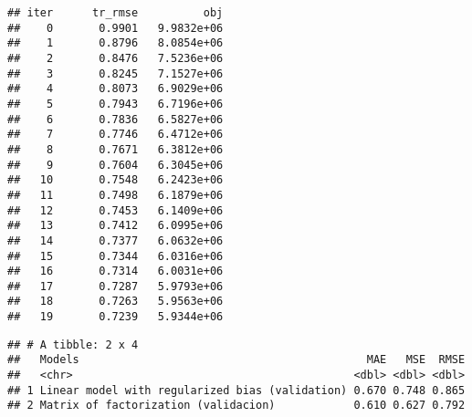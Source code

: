 \documentclass[
]{article}
\newenvironment{Shaded}{\begin{snugshade}}{\end{snugshade}}
\newcommand{\AttributeTok}[1]{\textcolor[rgb]{0.13,0.29,0.53}{#1}}
\newcommand{\CommentTok}[1]{\textcolor[rgb]{0.56,0.35,0.01}{\textit{#1}}}
\newcommand{\FunctionTok}[1]{\textcolor[rgb]{0.13,0.29,0.53}{\textbf{#1}}}
\newcommand{\NormalTok}[1]{#1}
\newcommand{\OtherTok}[1]{\textcolor[rgb]{0.56,0.35,0.01}{#1}}
\newcommand{\SpecialCharTok}[1]{\textcolor[rgb]{0.81,0.36,0.00}{\textbf{#1}}}
\newcommand{\StringTok}[1]{\textcolor[rgb]{0.31,0.60,0.02}{#1}}
\begin{document}
\begin{verbatim}
## iter      tr_rmse          obj
##    0       0.9901   9.9832e+06
##    1       0.8796   8.0854e+06
##    2       0.8476   7.5236e+06
##    3       0.8245   7.1527e+06
##    4       0.8073   6.9029e+06
##    5       0.7943   6.7196e+06
##    6       0.7836   6.5827e+06
##    7       0.7746   6.4712e+06
##    8       0.7671   6.3812e+06
##    9       0.7604   6.3045e+06
##   10       0.7548   6.2423e+06
##   11       0.7498   6.1879e+06
##   12       0.7453   6.1409e+06
##   13       0.7412   6.0995e+06
##   14       0.7377   6.0632e+06
##   15       0.7344   6.0316e+06
##   16       0.7314   6.0031e+06
##   17       0.7287   5.9793e+06
##   18       0.7263   5.9563e+06
##   19       0.7239   5.9344e+06
\end{verbatim}

\begin{Shaded}
\end{Shaded}

\begin{verbatim}
## # A tibble: 2 x 4
##   Models                                            MAE   MSE  RMSE
##   <chr>                                           <dbl> <dbl> <dbl>
## 1 Linear model with regularized bias (validation) 0.670 0.748 0.865
## 2 Matrix of factorization (validacion)            0.610 0.627 0.792
\end{verbatim}
\end{document}
